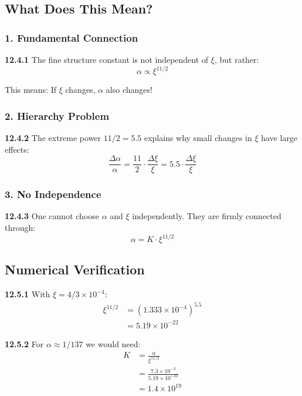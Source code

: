 \documentclass[12pt,a4paper]{article}
\begin{document}
\subsection{What Does This Mean?}

\subsubsection{1. Fundamental Connection}
\noindent \textbf{12.4.1} The fine structure constant is not independent of $\xi$, but rather:
\begin{equation}
	\alpha \propto \xi^{11/2}
\end{equation}

This means: If $\xi$ changes, $\alpha$ also changes!

\subsubsection{2. Hierarchy Problem}
\noindent \textbf{12.4.2} The extreme power $11/2 = 5.5$ explains why small changes in $\xi$ have large effects:
\begin{equation}
	\frac{\Delta \alpha}{\alpha} = \frac{11}{2} \cdot \frac{\Delta \xi}{\xi} = 5.5 \cdot \frac{\Delta \xi}{\xi}
\end{equation}

\subsubsection{3. No Independence}
\noindent \textbf{12.4.3} One cannot choose $\alpha$ and $\xi$ independently. They are firmly connected through:
\begin{equation}
	\alpha = K \cdot \xi^{11/2}
\end{equation}

\subsection{Numerical Verification}

\noindent \textbf{12.5.1} With $\xi = 4/3 \times 10^{-4}$:
\begin{align}
	\xi^{11/2} &= (1.333 \times 10^{-4})^{5.5} \\
	&= 5.19 \times 10^{-22}
\end{align}

\noindent \textbf{12.5.2} For $\alpha \approx 1/137$ we would need:
\begin{align}
	K &= \frac{\alpha}{\xi^{11/2}} \\
	&= \frac{7.3 \times 10^{-3}}{5.19 \times 10^{-22}} \\
	&= 1.4 \times 10^{19}
\end{align}
\end{document}
